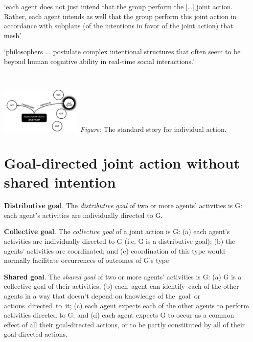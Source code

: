 \documentclass[11pt]{extarticle}
\begin{document}
\begin{multicols}{3}
`each agent does not just intend that the group perform the […] joint action. Rather, each agent intends as well that the group perform this joint action in accordance with subplans (of the intentions in favor of the joint action) that mesh' \citep%
{Bratman:1992mi}

`philosophers ... postulate complex intentional structures that often seem to be beyond human cognitive ability in real-time social interactions.'
\citep%
{Knoblich:2008hy}




\

\begin{center}
  \includegraphics[width=0.3\textwidth]{standard_story.png}
\emph{Figure}: The standard story for individual action.
\end{center}



\section{Goal-directed joint action without shared intention}

\textbf{Distributive goal}.  The \emph{distributive goal} of two or more agents' activities is G: each agent's activities are individually directed to G.

\textbf{Collective goal}.  The \emph{collective goal} of a joint action is G:
(a) each agent’s activities are individually directed to G (i.e. G is a distributive goal);
(b) the agents’ activities are coordinated; and 
(c) coordination of this type would normally  facilitate occurrences of outcomes of G's type

\textbf{Shared goal}.  The \emph{shared goal} of two or more agents' activities is G: (a) G is a collective goal of their activities; 
(b) each agent can identify each of the other agents in a way that doesn't depend on knowledge of the goal or	 actions directed to it;
(c) each agent expects each of the other agents to perform activities directed to G; and 
(d) each agent expects G to occur as a common effect of all their goal-directed actions, or to be partly constituted by all of their goal-directed actions.


\ 


\end{multicols}
\end{document}
